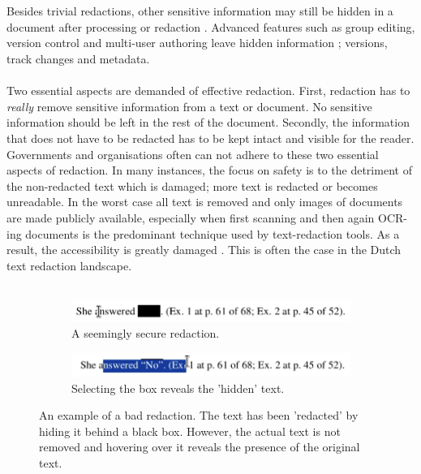\\\\
Besides trivial redactions, other sensitive information may still be hidden in a document after processing or redaction \cite{muller2021processing}. Advanced features such as group editing, version control and multi-user authoring leave hidden information \cite{forrester2005investigation}; versions, track changes and metadata. 
\\\\
Two essential aspects are demanded of effective redaction. First, redaction has to \textit{really} remove sensitive information from a text or document. No sensitive information should be left in the rest of the document. Secondly, the information that does not have to be redacted has to be kept intact and visible for the reader. Governments and organisations often can not adhere to these two essential aspects of redaction. In many instances, the focus on safety is to the detriment of the non-redacted text which is damaged; more text is redacted or becomes unreadable. In the worst case all text is removed and only images of documents are made publicly available, especially when first scanning and then again OCR-ing documents is the predominant technique used by text-redaction tools. As a result, the accessibility is greatly damaged \cite{maartenMarx}. This is often the case in the Dutch text redaction landscape. 
\\\\
\begin{figure}[h]
    \begin{subfigure}[h]{0.5\linewidth}
        \includegraphics[width=\linewidth]{latex/media/badredaction2.png}
        \caption{A seemingly secure redaction.}
    \end{subfigure}
    \hfill
        \begin{subfigure}[h]{0.5\linewidth}
        \includegraphics[width=\linewidth]{latex/media/badredaction.png}
    \caption{Selecting the box reveals the 'hidden' text.}
    \end{subfigure}%
\caption{An example of a bad redaction. The text has been 'redacted' by hiding it behind a black box. However, the actual text is not removed and hovering over it reveals the presence of the original text.}
\end{figure}
